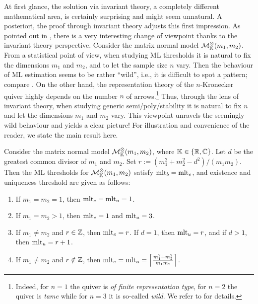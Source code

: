 At first glance, the solution via invariant theory, a completely different mathematical area, is certainly surprising and might seem unnatural. A posteriori, the proof through invariant theory adjusts this first impression.
As pointed out in \cite[Section~1.3]{DM21MatrixNormal}, there is a very interesting change of viewpoint thanks to the invariant theory perspective. Consider the matrix normal model $\mathcal{M}^{\otimes}_{\mathbb{K}}(m_1, m_2)$. From a statistical point of view, when studying ML thresholds it is natural to fix the dimensions $m_1$ and $m_2$, and to let the sample size $n$ vary. Then the behaviour of ML estimation seems to be rather ``wild'', i.e., it is difficult to spot a pattern; compare \cite{DrtonKurikiHoff, DM21MatrixNormal}.
On the other hand, the representation theory of the $n$-Kronecker quiver highly depends on the number $n$ of arrows.\footnote{Indeed, for $n=1$ the quiver is \emph{of finite representation type}, for $n=2$ the quiver is \emph{tame} while for $n=3$ it is so-called \emph{wild}. We refer to \cite{DerksenWeymanBook} for details.}
Thus, through the lens of invariant theory, when studying generic semi/poly/stability it is natural to fix $n$ and let the dimensions $m_1$ and $m_2$ vary. This viewpoint unravels the seemingly wild behaviour and yields a clear picture!
For illustration and convenience of the reader, we state the main result here.

\begin{theorem} \label{thm:MatrixNormalThresholdsDM21}
	Consider the matrix normal model $\mathcal{M}^{\otimes}_{\mathbb{K}}(m_1,m_2)$, where $\mathbb K \in \{\mathbb R, \mathbb C\}$. Let $d$ be the greatest common divisor of $m_1$ and $m_2$. Set $r:= (m_1^2 + m_2^2 - d^2)/(m_1 m_2)$. Then the ML thresholds for $\mathcal{M}^{\otimes}_{\mathbb{K}}(m_1,m_2)$ satisfy $\operatorname{mlt}_b = \operatorname{mlt}_e$, and existence and uniqueness threshold are given as follows:
	\begin{enumerate}\itemsep 0pt
		\item If $m_1 = m_2 = 1$, then $\operatorname{mlt}_e = \operatorname{mlt}_u = 1$.
		
		\item If $m_1 = m_2 > 1$, then $\operatorname{mlt}_e = 1$ and $\operatorname{mlt}_u = 3$.
		
		\item If $m_1 \neq m_2$ and $r \in \mathbb Z$, then $\operatorname{mlt}_e = r$. If $d=1$, then $\operatorname{mlt}_u = r$, and if $d>1$, then $\operatorname{mlt}_u = r+1$.
		
		\item If $m_1 \neq m_2$ and $r \notin \mathbb Z$, then $\operatorname{mlt}_e = \operatorname{mlt}_u = \Big\lceil \frac{m_1^2 + m_2^2}{m_1 m_2} \Big\rceil$.
	\end{enumerate}
\end{theorem}

